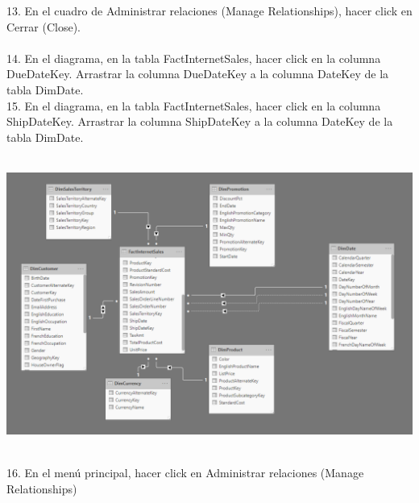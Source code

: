 \begin{flushleft}
\begin{itemize}
13. En el cuadro de Administrar relaciones (Manage Relationships), hacer click en Cerrar (Close).\\
\textbf{ }\\

14. En el diagrama, en la tabla FactInternetSales, hacer click en la columna DueDateKey. Arrastrar la columna
DueDateKey a la columna DateKey de la tabla DimDate.\\
15. En el diagrama, en la tabla FactInternetSales, hacer click en la columna ShipDateKey. Arrastrar la
columna ShipDateKey a la columna DateKey de la tabla DimDate.\\
\textbf{ }\\
\begin{center}
	\includegraphics[width=20cm]{./Imagenes/img6} 
	\end{center}
\textbf{ }\\

16. En el menú principal, hacer click en Administrar relaciones (Manage Relationships)\\


\end{itemize}
\end{flushleft}
